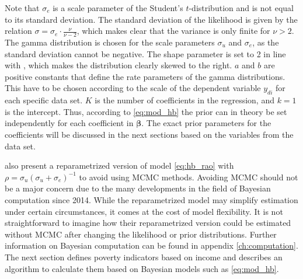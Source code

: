 Note that $\sigma_e$ is a scale parameter of the Student's $t$-distribution and is not equal to its standard deviation.
The standard deviation of the likelihood is given by the relation $\sigma = \sigma_e \cdot \frac{\nu}{\nu - 2}$, which makes clear that the variance is only finite for $\nu > 2$.
The gamma distribution is chosen for the scale parameters $\sigma_u$ and $\sigma_e$, as the standard deviation cannot be negative.
The shape parameter is set to 2 in line with \cite{gelman_prior_2020}, which makes the distribution clearly skewed to the right.
$a$ and $b$ are positive constants that define the rate parameters of the gamma distributions.
This have to be chosen according to the scale of the dependent variable $y_{di}$ for each specific data set.
$K$ is the number of coefficients in the regression, and $k = 1$ is the intercept.
Thus, according to \ref{eq:mod_hb} the prior can in theory be set independently for each coefficient in $\boldsymbol \beta$.
The exact prior parameters for the coefficients will be discussed in the next sections based on the variables from the data set.


\cite{molina_small_2014} also present a reparametrized version of model \ref{eq:hb_rao} with $\rho = \sigma_u(\sigma_u + \sigma_e)^{-1} $ to avoid using MCMC methods.
Avoiding MCMC should not be a major concern due to the many developments in the field of Bayesian computation since 2014.
While the reparametrized model may simplify estimation under certain circumstances, it comes at the cost of model flexibility. It is not straightforward to imagine how their reparametrized version could be estimated without MCMC after changing the likelihood or prior distributions.
Further information on Bayesian computation can be found in appendix \ref{ch:computation}.
The next section defines poverty indicators based on income and describes an algorithm to calculate them based on Bayesian models such as \ref{eq:mod_hb}.